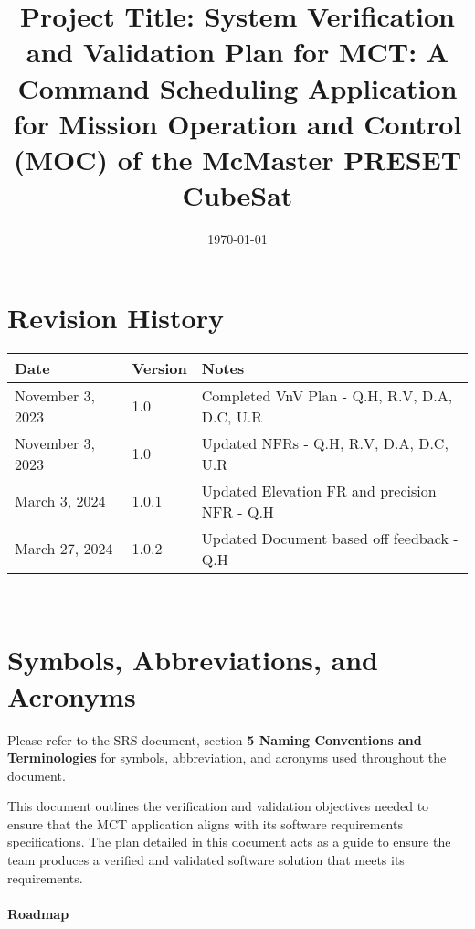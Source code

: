 \documentclass[12pt, titlepage]{article}
\begin{document}
\title{Project Title: System Verification and Validation Plan for MCT: A Command Scheduling Application for Mission Operation and Control (MOC) of the McMaster PRESET CubeSat}
\author{\authname}
\date{\today}
	
\maketitle


\section*{Revision History}

\begin{tabularx}{\textwidth}{p{3cm}p{2cm}X}
\toprule {\bf Date} & {\bf Version} & {\bf Notes}\\
\midrule
November 3, 2023 & 1.0 & Completed VnV Plan - Q.H, R.V, D.A, D.C, U.R\\

November 3, 2023 & 1.0 & Updated NFRs - Q.H, R.V, D.A, D.C, U.R\\
March 3, 2024 & 1.0.1 & Updated Elevation FR and precision NFR - Q.H\\
March 27, 2024 & 1.0.2 & Updated Document based off feedback - Q.H\\

\bottomrule
\end{tabularx}

~\\

\newpage

\tableofcontents

\newpage

\section{Symbols, Abbreviations, and Acronyms}

Please refer to the SRS document, section \textbf{5 Naming Conventions and Terminologies} for symbols, abbreviation, and acronyms used throughout the document.


This document outlines the verification and validation objectives needed to ensure that the MCT application aligns with its software requirements specifications. The plan detailed in this document acts as a guide to ensure the team produces a verified and validated software solution that meets its requirements. 
\\\\
\textbf{Roadmap}
\end{document}
